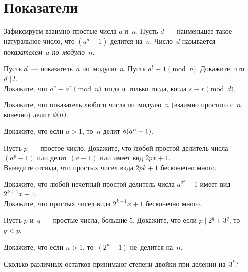 
\section*{Показатели}


\begingroup \def\eulerphi{\mathrm{\phi}}

Зафиксируем взаимно простые числа $a$ и~$n$.
Пусть $d$~--- наименьшее такое натуральное число, что $(a^d - 1)$ делится
на~$n$.
Число~$d$ называется \emph{показателем~$a$ по~модулю~$n$}.

\begin{problems}

\item
\subproblem
Пусть $d$~--- показатель~$a$ по~модулю~$n$.
Пусть $a^l \equiv 1 \pmod{n}$.
Докажите, что $d \mid l$.
\\
\subproblem
Докажите, что $a^s \equiv a^r \pmod{n}$ тогда и~только тогда, когда
$s \equiv r \pmod{d}$.

\item
Докажите, что показатель любого числа по~модулю~$n$ (взаимно простого с~$n$,
конечно) делит $\eulerphi(n)$.

\item
Докажите, что если $a > 1$, то~$n$ делит $\eulerphi(a^n - 1)$.

\item
\subproblem
Пусть $p$~--- простое число.
Докажите, что любой простой делитель числа $(a^p - 1)$ или делит $(a - 1)$ или
имеет вид $2 p x + 1$.
\\
\subproblem
Выведите отсюда, что простых чисел вида $2 p k + 1$ бесконечно много.

\item
\subproblem
Докажите, что любой нечетный простой делитель числа $a^{2^{k}} + 1$ имеет вид
$2^{k+1} x + 1$.
\\
\subproblem
Докажите, что простых чисел вида $2^{k+1} x + 1$ бесконечно много.

\item
Пусть $p$ и~$q$~--- простые числа, большие 5.
Докажите, что если $p \mid 2^q + 3^q$, то~$q < p$.

\item
Докажите, что если $n > 1$, то~$(2^n - 1)$ не~делится на~$n$. 

\item
Сколько различных остатков принимают степени двойки при делении на~$3^k$?

\end{problems}

\endgroup %


